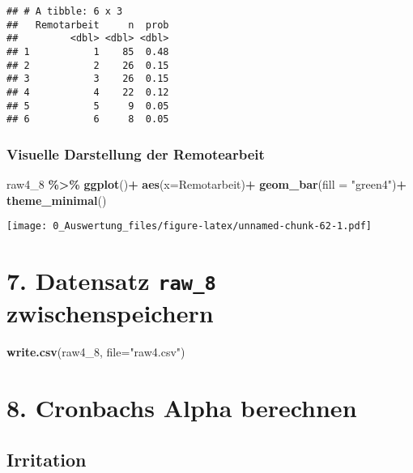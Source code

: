 \documentclass[
]{article}
\newenvironment{Shaded}{\begin{snugshade}}{\end{snugshade}}
\newcommand{\AttributeTok}[1]{\textcolor[rgb]{0.13,0.29,0.53}{#1}}
\newcommand{\FunctionTok}[1]{\textcolor[rgb]{0.13,0.29,0.53}{\textbf{#1}}}
\newcommand{\NormalTok}[1]{#1}
\newcommand{\SpecialCharTok}[1]{\textcolor[rgb]{0.81,0.36,0.00}{\textbf{#1}}}
\newcommand{\StringTok}[1]{\textcolor[rgb]{0.31,0.60,0.02}{#1}}
\begin{document}
\begin{verbatim}
## # A tibble: 6 x 3
##   Remotarbeit     n  prob
##         <dbl> <dbl> <dbl>
## 1           1    85  0.48
## 2           2    26  0.15
## 3           3    26  0.15
## 4           4    22  0.12
## 5           5     9  0.05
## 6           6     8  0.05
\end{verbatim}

\subsubsection{Visuelle Darstellung der
Remotearbeit}\label{visuelle-darstellung-der-remotearbeit}

\begin{Shaded}
\begin{Highlighting}[]
\NormalTok{raw4\_8 }\SpecialCharTok{\%\textgreater{}\%} 
  \FunctionTok{ggplot}\NormalTok{()}\SpecialCharTok{+}
  \FunctionTok{aes}\NormalTok{(}\AttributeTok{x=}\NormalTok{Remotarbeit)}\SpecialCharTok{+}
  \FunctionTok{geom\_bar}\NormalTok{(}\AttributeTok{fill =} \StringTok{"green4"}\NormalTok{)}\SpecialCharTok{+}
  \FunctionTok{theme\_minimal}\NormalTok{()}
\end{Highlighting}
\end{Shaded}

\texttt{[image: 0\_Auswertung\_files/figure-latex/unnamed-chunk-62-1.pdf]}

\section{\texorpdfstring{7. Datensatz \texttt{raw\_8}
zwischenspeichern}{7. Datensatz raw\_8 zwischenspeichern}}\label{datensatz-raw_8-zwischenspeichern}

\begin{Shaded}
\begin{Highlighting}[]
\FunctionTok{write.csv}\NormalTok{(raw4\_8, }\AttributeTok{file=}\StringTok{"raw4.csv"}\NormalTok{)}
\end{Highlighting}
\end{Shaded}

\section{8. Cronbachs Alpha berechnen}\label{cronbachs-alpha-berechnen}

\subsection{Irritation}\label{irritation}
\end{document}
